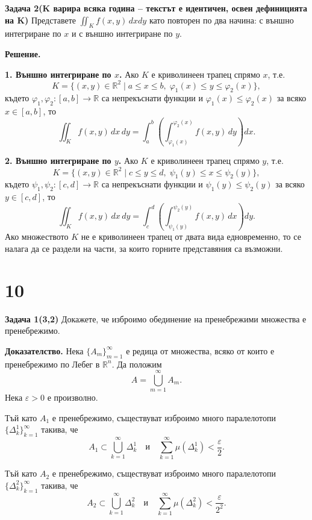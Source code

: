 \documentclass[10pt]{article}
\begin{document}
\textbf{Задача 2(K варира всяка година – текстът е идентичен, освен дефиницията на K)} Представете $\iint_K f(x,y)\,dxdy$ като повторен по два начина: с външно интегриране по $x$ и с външно интегриране по $y$.

\textbf{Решение. }

\vspace{0.1cm}
\noindent
\textbf{1. Външно интегриране по $x$.}  
Ако $K$ е криволинеен трапец спрямо $x$, т.е.
\[
K = \{(x,y) \in \mathbb{R}^2 \mid a \le x \le b,\; \varphi_1(x) \le y \le \varphi_2(x)\},
\]
където $\varphi_1,\varphi_2 : [a,b] \to \mathbb{R}$ са непрекъснати функции и $\varphi_1(x) \le \varphi_2(x)$ за всяко $x \in [a,b]$, то
\[
\iint_K f(x,y)\,dx\,dy = \int_a^b \left( \int_{\varphi_1(x)}^{\varphi_2(x)} f(x,y)\,dy \right) dx.
\]

\vspace{0.1cm}
\noindent
\textbf{2. Външно интегриране по $y$.}  
Ако $K$ е криволинеен трапец спрямо $y$, т.е.
\[
K = \{(x,y) \in \mathbb{R}^2 \mid c \le y \le d,\; \psi_1(y) \le x \le \psi_2(y)\},
\]
където $\psi_1,\psi_2 : [c,d] \to \mathbb{R}$ са непрекъснати функции и $\psi_1(y) \le \psi_2(y)$ за всяко $y \in [c,d]$, то
\[
\iint_K f(x,y)\,dx\,dy = \int_c^d \left( \int_{\psi_1(y)}^{\psi_2(y)} f(x,y)\,dx \right) dy.
\]
\noindent
Ако множеството $K$ не е криволинеен трапец от двата вида едновременно, то се налага да се раздели на части, за които горните представяния са възможни.

\section*{10}

\textbf{Задача 1(3,2) }Докажете, че изброимо обединение на пренебрежими множества е пренебрежимо.

\textbf{Доказателство.} 
Нека $\{A_m\}_{m=1}^{\infty}$ е редица от множества, всяко от които е пренебрежимо по Лебег в $\mathbb{R}^n$.  
Да положим
\[
A = \bigcup_{m=1}^{\infty} A_m.
\]
Нека $\varepsilon > 0$ е произволно.

Тъй като $A_1$ е пренебрежимо, съществуват изброимо много паралелотопи $\{\Delta_k^1\}_{k=1}^{\infty}$ такива, че
\[
A_1 \subset \bigcup_{k=1}^{\infty} \Delta_k^1 \quad \text{и} \quad \sum_{k=1}^{\infty} \mu(\Delta_k^1) < \frac{\varepsilon}{2}.
\]

Тъй като $A_2$ е пренебрежимо, съществуват изброимо много паралелотопи $\{\Delta_k^2\}_{k=1}^{\infty}$ такива, че
\[
A_2 \subset \bigcup_{k=1}^{\infty} \Delta_k^2 \quad \text{и} \quad \sum_{k=1}^{\infty} \mu(\Delta_k^2) < \frac{\varepsilon}{2^2}.
\]
\end{document}
